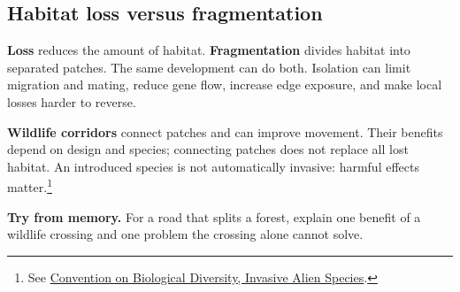 \documentclass[11pt,letterpaper]{article}
\newcommand{\memorycheck}[1]{\par\smallskip\textbf{Try from memory.} #1\par}
\begin{document}
\subsection*{Habitat loss versus fragmentation}
\textbf{Loss} reduces the amount of habitat. \textbf{Fragmentation} divides habitat into separated patches. The same development can do both. Isolation can limit migration and mating, reduce gene flow, increase edge exposure, and make local losses harder to reverse.
\begin{center}
\par
\end{center}
\textbf{Wildlife corridors} connect patches and can improve movement. Their benefits depend on design and species; connecting patches does not replace all lost habitat. An introduced species is not automatically invasive: harmful effects matter.\footnote{See \href{https://www.cbd.int/invasive}{Convention on Biological Diversity, Invasive Alien Species}.}
\memorycheck{For a road that splits a forest, explain one benefit of a wildlife crossing and one problem the crossing alone cannot solve.}
\end{document}
